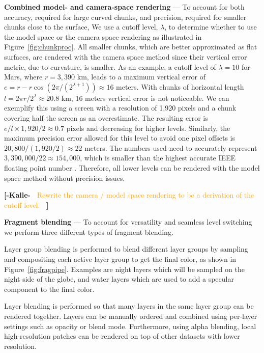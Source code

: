 \documentclass[journal]{vgtc}                %
\newcommand{\kallecomment}[1]{\textbf{[-Kalle-~}
    \textcolor{orange}{#1}
    \textbf{~]}}
\newcommand{\fig}[1]{Figure~\ref{fig:#1}}
\begin{document}
\noindent\textbf{Combined model- and camera-space rendering} ---
To account for both accuracy, required for large curved chunks, and precision, required for smaller chunks close to the surface, We use a cutoff level, $\lambda$, to determine whether to use the model space or the camera space rendering as illustrated in \fig{chunkproc}.
All smaller chunks, which are better approximated as flat surfaces, are rendered with the camera space method since their vertical error metric, due to curvature, is smaller.
As an example, a cutoff level of $\lambda = 10$ for Mars, where $r=3,390$ km, leads to a maximum vertical error of $e = r - r \cos{(2\pi/(2^{\lambda + 1}))} \approx 16$ meters.
With chunks of horizontal length $l = 2\pi r / 2^{\lambda} \approx 20.8$ km, 16 meters vertical error is not noticeable. We can exemplify this using a screen with a resolution of 1,920 pixels and a chunk covering half the screen as an overestimate. The resulting error is $e / l  \times 1,920 / 2 \approx 0.7$ pixels and decreasing for higher levels.
Similarly, the maximum precision error allowed for this level to avoid one pixel offsets is $20,800 / (1,920 / 2) \approx 22$ meters. The numbers used need to accurately represent $3,390,000 / 22 \approx 154,000$, which is smaller than the highest accurate IEEE floating point number \cite{kooima2009planetary}. Therefore, all lower levels can be rendered with the model space method without precision issues.

\kallecomment{Rewrite the camera / model space rendering to be a derivation of the cutoff level.}

\fi


\noindent\textbf{Fragment blending} ---
To account for versatility and seamless level switching %
we perform three different types of fragment blending.

Layer group blending is performed to blend different layer groups by sampling and compositing each active layer group to get the final color, as shown in \fig{fragpipe}.
Examples are night layers which will be sampled on the night side of the globe, and water layers which are used to add a specular component to the final color.

Layer blending is performed so that many layers in the same layer group can be rendered together. Layers can be manually ordered and combined using per-layer settings such as opacity or blend mode. Furthermore, using alpha blending, local high-resolution patches can be rendered on top of other datasets with lower resolution.
\end{document}
